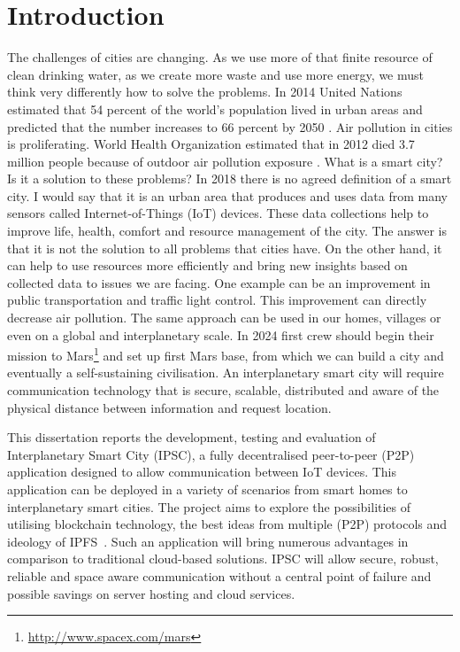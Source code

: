 \chapter{Introduction\label{chap:introduction}}
\quad The challenges of cities are changing. As we use more of that finite resource of clean drinking water, as we create more waste and use more energy, we must think very differently how to solve the problems. In 2014 United Nations estimated that 54 percent of the world's population lived in urban areas and predicted that the number increases to 66 percent by 2050 \cite{noauthor_worlds_2014}. Air pollution in cities is proliferating. World Health Organization estimated that in 2012 died 3.7 million people because of outdoor air pollution exposure \cite{noauthor_who_2014}. What is a smart city? Is it a solution to these problems? In 2018 there is no agreed definition of a smart city. I would say that it is an urban area that produces and uses data from many sensors called Internet-of-Things (IoT) devices. These data collections help to improve life, health, comfort and resource management of the city. The answer is that it is not the solution to all problems that cities have. On the other hand, it can help to use resources more efficiently and bring new insights based on collected data to issues we are facing. One example can be an improvement in public transportation and traffic light control. This improvement can directly decrease air pollution. The same approach can be used in our homes, villages or even on a global and interplanetary scale. In 2024 first crew should begin their mission to Mars\footnote{\url{http://www.spacex.com/mars}} and set up first Mars base, from which we can build a city and eventually a self-sustaining civilisation. An interplanetary smart city will require communication technology that is secure, scalable, distributed and aware of the physical distance between information and request location.
\vspace{\baselineskip}

This dissertation reports the development, testing and evaluation of Interplanetary Smart City (IPSC), a fully decentralised peer-to-peer (P2P) application designed to allow communication between IoT devices. This application can be deployed in a variety of scenarios from smart homes to interplanetary smart cities. The project aims to explore the possibilities of utilising blockchain technology, the best ideas from multiple (P2P) protocols and ideology of IPFS~\cite{labs_ipfs_nodate}. Such an application will bring numerous advantages in comparison to traditional cloud-based solutions. IPSC will allow secure, robust, reliable and space aware communication without a central point of failure and possible savings on server hosting and cloud services.

